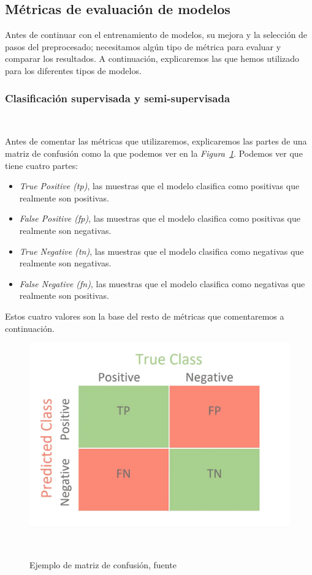 \subsection{Métricas de evaluación de modelos}

Antes de continuar con el entrenamiento de modelos, su mejora y la selección de pasos del preprocesado; necesitamos algún tipo de métrica para evaluar y comparar los resultados. A continuación, explicaremos las que hemos utilizado para los diferentes tipos de modelos.

\subsubsection{Clasificación supervisada y semi-supervisada}\ \label{sec:classification-metrics}

Antes de comentar las métricas que utilizaremos, explicaremos las partes de una matriz de confusión como la que podemos ver en la \textit{Figura\ \ref{fig:confusion-matrix-example}}. Podemos ver que tiene cuatro partes:

\begin{itemize}
    \item \textit{True Positive (tp)}, las muestras que el modelo clasifica como positivas que realmente son positivas.
    \item \textit{False Positive (fp)}, las muestras que el modelo clasifica como positivas que realmente son negativas.
    \item \textit{True Negative (tn)}, las muestras que el modelo clasifica como negativas que realmente son negativas.
    \item \textit{False Negative (fn)}, las muestras que el modelo clasifica como negativas que realmente son positivas.
\end{itemize}

Estos cuatro valores son la base del resto de métricas que comentaremos a continuación.

\begin{figure}[!ht]
    \centering
    \includegraphics[width=0.7\linewidth]{media/images/confusion-matrix-example.png}
    \caption{Ejemplo de matriz de confusión, fuente\ \cite{Confusio71:online}}\ \label{fig:confusion-matrix-example}
\end{figure}

